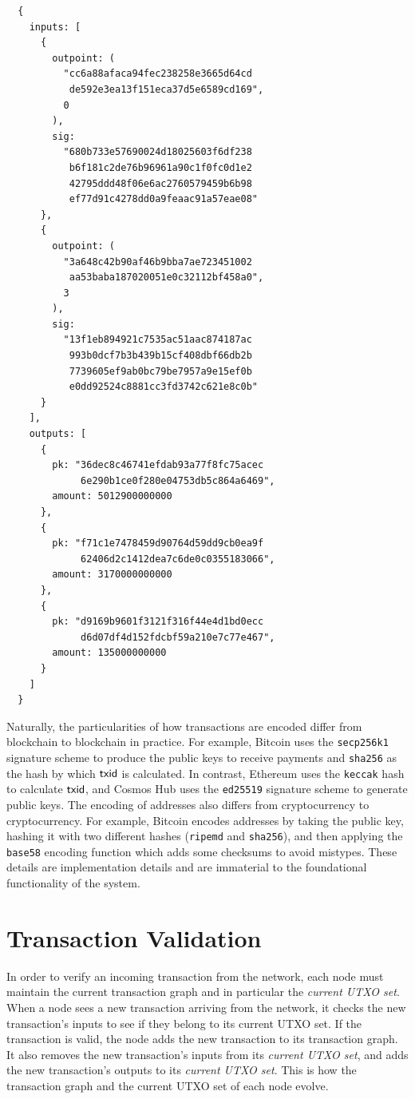 \begin{Verbatim}
  {
    inputs: [
      {
        outpoint: (
          "cc6a88afaca94fec238258e3665d64cd
           de592e3ea13f151eca37d5e6589cd169",
          0
        ),
        sig:
          "680b733e57690024d18025603f6df238
           b6f181c2de76b96961a90c1f0fc0d1e2
           42795ddd48f06e6ac2760579459b6b98
           ef77d91c4278dd0a9feaac91a57eae08"
      },
      {
        outpoint: (
          "3a648c42b90af46b9bba7ae723451002
           aa53baba187020051e0c32112bf458a0",
          3
        ),
        sig:
          "13f1eb894921c7535ac51aac874187ac
           993b0dcf7b3b439b15cf408dbf66db2b
           7739605ef9ab0bc79be7957a9e15ef0b
           e0dd92524c8881cc3fd3742c621e8c0b"
      }
    ],
    outputs: [
      {
        pk: "36dec8c46741efdab93a77f8fc75acec
             6e290b1ce0f280e04753db5c864a6469",
        amount: 5012900000000
      },
      {
        pk: "f71c1e7478459d90764d59dd9cb0ea9f
             62406d2c1412dea7c6de0c0355183066",
        amount: 3170000000000
      },
      {
        pk: "d9169b9601f3121f316f44e4d1bd0ecc
             d6d07df4d152fdcbf59a210e7c77e467",
        amount: 135000000000
      }
    ]
  }
\end{Verbatim}

Naturally, the particularities of how transactions are encoded differ from blockchain
to blockchain in practice. For example, Bitcoin uses the \texttt{secp256k1} signature
scheme to produce the public keys to receive payments and
\texttt{sha256} as the hash by which $\mathsf{txid}$ is calculated.
In contrast, Ethereum uses the \texttt{keccak} hash to calculate $\mathsf{txid}$,
and Cosmos Hub uses the \texttt{ed25519} signature scheme to generate public keys.
The encoding of addresses also differs from cryptocurrency to cryptocurrency.
For example, Bitcoin encodes addresses by taking the public key,
hashing it with two different hashes (\texttt{ripemd} and \texttt{sha256}),
and then applying the \texttt{base58}
encoding function which adds some checksums to avoid mistypes.
These details are implementation details and are immaterial to the foundational
functionality of the system.

\section{Transaction Validation}

In order to verify an incoming transaction from the network, each node must maintain the current transaction
graph and in particular the \emph{current UTXO set}.
When a node sees a new transaction arriving from
the network, it checks the new transaction's inputs to see if they belong to its current UTXO set.
If the transaction is valid, the node adds the new transaction to its transaction graph.
It also removes the new transaction's inputs
from its \emph{current UTXO set}, and adds the new transaction's outputs to its \emph{current UTXO set}.
This is how the transaction graph and the current UTXO set of each node evolve.

